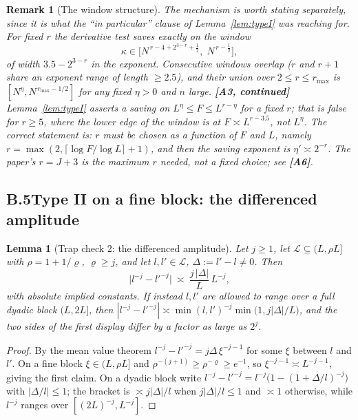 \documentclass[11pt]{article}
\newtheorem{lemma}[theorem]{Lemma}
\newtheorem{remark}[theorem]{Remark}
\theoremstyle{definition}
\theoremstyle{plain}
\begin{document}
\begin{remark}[The window structure]\label{rem:window}
The mechanism is worth stating separately, since it is what the ``in
particular'' clause of Lemma~\ref{lem:typeI} was reaching for.  For fixed
$r$ the derivative test saves exactly on the window
\[
\kappa\in\bigl[N^{\,r-4+2^{3-r}+\frac12},\;N^{\,r-\frac12}\bigr],
\]
of width $3.5-2^{3-r}$ in the exponent.  Consecutive windows overlap
($r$ and $r+1$ share an exponent range of length $\ge2.5$), and their
union over $2\le r\le r_{\max}$ is
$[N^{\eta},N^{\,r_{\max}-1/2}]$ for any fixed $\eta>0$ and $n$ large.
\textbf{[A3, continued]}  Lemma~\ref{lem:typeI} asserts a saving on
$L^{\eta}\le F\le L^{r-\eta}$ \emph{for a fixed $r$}; that is false for
$r\ge5$, where the lower edge of the window is at $F\asymp L^{r-3.5}$,
not $L^{\eta}$.  The correct statement is: $r$ must be chosen as a
function of $F$ and $L$, namely $r=\max(2,\lceil\log F/\log L\rceil+1)$,
and then the saving exponent is $\eta'\asymp2^{-r}$.  The paper's
$r=J+3$ is the \emph{maximum} $r$ needed, not a fixed choice; see
\textbf{[A6]}.
\end{remark}

\subsection*{B.5\quad Type II on a fine block: the differenced amplitude}

\begin{lemma}[Trap check 2: the differenced amplitude]\label{lem:diffamp}
Let $j\ge1$, let $\mathcal L\subseteq(L,\rho L]$ with
$\rho=1+1/\varrho$, $\varrho\ge j$, and let $l,l'\in\mathcal L$,
$\Delta:=l'-l\ne0$.  Then
\[
\bigl|l^{-j}-l'^{-j}\bigr|\ \asymp\ \frac{j\,|\Delta|}{L}\,L^{-j},
\]
with absolute implied constants.  If instead $l,l'$ are allowed to range
over a full dyadic block $(L,2L]$, then
$|l^{-j}-l'^{-j}|\asymp\min(l,l')^{-j}\min\bigl(1,j|\Delta|/L\bigr)$,
and the two sides of the first display differ by a factor as large as
$2^{j}$.
\end{lemma}

\begin{proof}
By the mean value theorem $l^{-j}-l'^{-j}=j\Delta\,\xi^{-j-1}$ for some
$\xi$ between $l$ and $l'$.  On a fine block $\xi\in(L,\rho L]$ and
$\rho^{-(j+1)}\ge\rho^{-\varrho}\ge e^{-1}$, so
$\xi^{-j-1}\asymp L^{-j-1}$, giving the first claim.  On a dyadic block
write $l^{-j}-l'^{-j}=l^{-j}\bigl(1-(1+\Delta/l)^{-j}\bigr)$ with
$|\Delta/l|\le1$; the bracket is $\asymp j|\Delta|/l$ when
$j|\Delta|/l\le1$ and $\asymp1$ otherwise, while $l^{-j}$ ranges over
$[(2L)^{-j},L^{-j}]$.
\end{proof}
\end{document}
